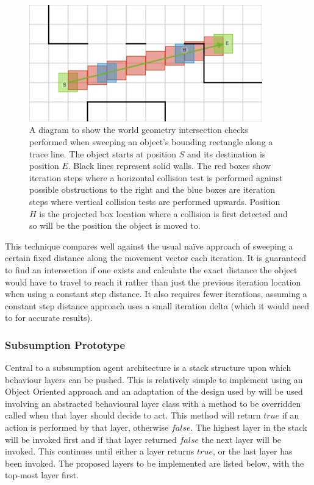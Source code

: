 \documentclass[12pt,a4paper]{article}
\begin{document}
\begin{figure}[h]
\centering
\includegraphics[width=0.9\textwidth]{trace}
\caption{A diagram to show the world geometry intersection checks performed when sweeping an object's bounding rectangle along a trace line. The object starts at position $S$ and its destination is position $E$. Black lines represent solid walls. The red boxes show iteration steps where a horizontal collision test is performed against possible obstructions to the right and the blue boxes are iteration steps where vertical collision tests are performed upwards. Position $H$ is the projected box location where a collision is first detected and so will be the position the object is moved to.}
\label{fig:trace}
\end{figure}

This technique compares well against the usual na\"{i}ve approach of sweeping a certain fixed distance along the movement vector each iteration. It is guaranteed to find an intersection if one exists and calculate the exact distance the object would have to travel to reach it rather than just the previous iteration location when using a constant step distance. It also requires fewer iterations, assuming a constant step distance approach uses a small iteration delta (which it would need to for accurate results).

\subsubsection{Subsumption Prototype}\noindent
Central to a subsumption agent architecture is a stack structure upon which behaviour layers can be pushed. This is relatively simple to implement using an Object Oriented approach and an adaptation of the design used by  \citeyear{butler01} will be used involving an abstracted behavioural layer class with a method to be overridden called when that layer should decide to act. This method will return $true$ if an action is performed by that layer, otherwise $false$. The highest layer in the stack will be invoked first and if that layer returned $false$ the next layer will be invoked. This continues until either a layer returns $true$, or the last layer has been invoked. The proposed layers to be implemented are listed below, with the top-most layer first.
\end{document}
